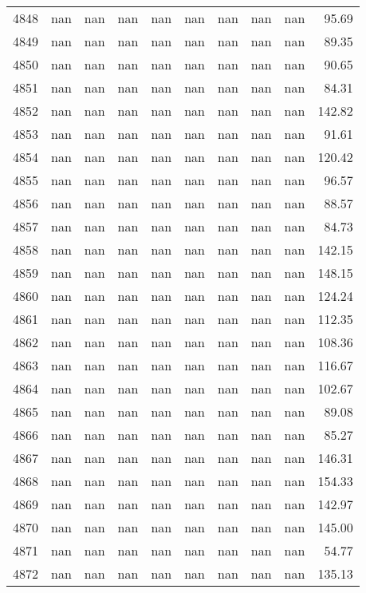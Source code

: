 \begin{tabular}{lrrrrrrrrr}
4848 & nan & nan & nan & nan & nan & nan & nan & nan & 95.69 \\
4849 & nan & nan & nan & nan & nan & nan & nan & nan & 89.35 \\
4850 & nan & nan & nan & nan & nan & nan & nan & nan & 90.65 \\
4851 & nan & nan & nan & nan & nan & nan & nan & nan & 84.31 \\
4852 & nan & nan & nan & nan & nan & nan & nan & nan & 142.82 \\
4853 & nan & nan & nan & nan & nan & nan & nan & nan & 91.61 \\
4854 & nan & nan & nan & nan & nan & nan & nan & nan & 120.42 \\
4855 & nan & nan & nan & nan & nan & nan & nan & nan & 96.57 \\
4856 & nan & nan & nan & nan & nan & nan & nan & nan & 88.57 \\
4857 & nan & nan & nan & nan & nan & nan & nan & nan & 84.73 \\
4858 & nan & nan & nan & nan & nan & nan & nan & nan & 142.15 \\
4859 & nan & nan & nan & nan & nan & nan & nan & nan & 148.15 \\
4860 & nan & nan & nan & nan & nan & nan & nan & nan & 124.24 \\
4861 & nan & nan & nan & nan & nan & nan & nan & nan & 112.35 \\
4862 & nan & nan & nan & nan & nan & nan & nan & nan & 108.36 \\
4863 & nan & nan & nan & nan & nan & nan & nan & nan & 116.67 \\
4864 & nan & nan & nan & nan & nan & nan & nan & nan & 102.67 \\
4865 & nan & nan & nan & nan & nan & nan & nan & nan & 89.08 \\
4866 & nan & nan & nan & nan & nan & nan & nan & nan & 85.27 \\
4867 & nan & nan & nan & nan & nan & nan & nan & nan & 146.31 \\
4868 & nan & nan & nan & nan & nan & nan & nan & nan & 154.33 \\
4869 & nan & nan & nan & nan & nan & nan & nan & nan & 142.97 \\
4870 & nan & nan & nan & nan & nan & nan & nan & nan & 145.00 \\
4871 & nan & nan & nan & nan & nan & nan & nan & nan & 54.77 \\
4872 & nan & nan & nan & nan & nan & nan & nan & nan & 135.13 \\

\end{tabular}
